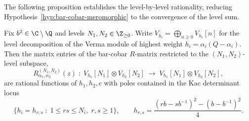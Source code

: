 The following proposition establishes the level-by-level
rationality, reducing
Hypothesis~\ref{hyp:bar-cobar-meromorphic} to the convergence
of the level sum.

\begin{proposition}
\label{prop:level-rationality}
\label{prop:level-rationality-R-bar}
Fix $b^2 \in \C \setminus \Q$ and levels
$N_1, N_2 \in \Z_{\ge 0}$. Write
$V_{h_i} = \bigoplus_{n \ge 0} V_{h_i}[n]$ for the
level decomposition of the Verma module of highest weight
$h_i = \alpha_i(Q - \alpha_i)$. Then the matrix entries
of the bar-cobar $R$-matrix restricted to the
$(N_1, N_2)$-level subspace,
\[
 R^{(N_1,N_2)}_{\alpha_1,\alpha_2}(z)
 \;\colon\;
 V_{h_1}[N_1] \otimes V_{h_2}[N_2]
 \;\longrightarrow\;
 V_{h_1}[N_1] \otimes V_{h_2}[N_2],
\]
are rational functions of\/
$h_1, h_2, c$ with poles contained in the Kac
determinant locus
\[
 \bigl\{
 h_i = h_{r,s}
 \;:\;
 1 \le rs \le N_i,\;
 r,s \ge 1
 \bigr\},
 \qquad
 h_{r,s}
 = \frac{(rb - sb^{-1})^2 - (b - b^{-1})^2}{4}.
\]
\end{proposition}

